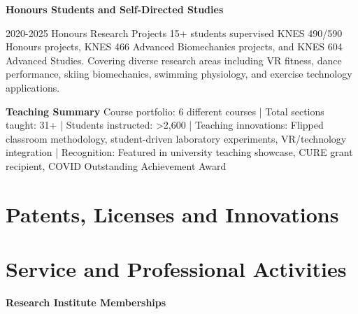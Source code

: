 \documentclass[]{friggeri-cv}
\begin{document}
{\Large\textbf{Honours Students and Self-Directed Studies}}

\begin{entrylist}
\entry
{2020-2025}
{Honours Research Projects}
{15+ students supervised}
{KNES 490/590 Honours projects, KNES 466 Advanced Biomechanics projects, and KNES 604 Advanced Studies. Covering diverse research areas including VR fitness, dance performance, skiing biomechanics, swimming physiology, and exercise technology applications.}
\end{entrylist}

{\Large\textbf{Teaching Summary}}
Course portfolio: 6 different courses | Total sections taught: 31+ | Students instructed: >2,600 | Teaching innovations: Flipped classroom methodology, student-driven laboratory experiments, VR/technology integration | Recognition: Featured in university teaching showcase, CURE grant recipient, COVID Outstanding Achievement Award

\section{Patents, Licenses and Innovations}
\begin{entrylist}
\end{entrylist}

\section{Service and Professional Activities}

{\Large\textbf{Research Institute Memberships}}
\begin{entrylist}
\end{entrylist}
\end{document}
